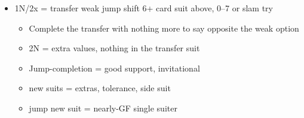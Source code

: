 \documentclass[a4paper,14pt]{extarticle}
\begin{document}
\begin{itemize}
\begin{itemize}
\begin{itemize}
\begin{itemize}
				single-suited hand, the longer suit with the two-suited option or as above with
				the three-suiter. After 2\spades - 2NT, 3\clubs asks which option (longer suit or 3NT with longer clubs)
				and other suits are swiss-or-correct below game or pass-or-correct above.
			\item After showing a 3-suiter, responder bids 3NT to play or a suit at the lowest level
				to agree the suit and make a slam try, or a suit at game to play.
			\item After GF+ suit agreement with a 3-suiter if Swiss is still available then 
				4\clubs/\diamonds is Swiss , otherwise suit bids are
				first round controls. 4NT is RKCB .
			\item After 1\diamonds-1x and showing suit(s) by opener, bidding 4\clubs/\diamonds
				is Swiss  agreeing opener's most recently bid suit, bidding one of the other suits below 
				game is slam inviting asking opener to bid swiss for that suit. Other suits below 3NT are an enquiry
				either wanting a stop or to find out openers' longer suit.
			\end{itemize}
      \item Jump suit rebids are almost-GF, semi-solid single-suited.
		\end{itemize}
   \item 1N/2x = transfer weak jump shift 6+ card suit above, 0--7 or slam try
		\begin{itemize}
		\item Complete the transfer with nothing more to say opposite the weak option
		\item 2N = extra values, nothing in the transfer suit
		\item Jump-completion = good support, invitational
		\item new suits = extras, tolerance, side suit
		\item jump new suit = nearly-GF single suiter
		\end{itemize}
	\end{itemize}


\end{itemize}
\end{document}
